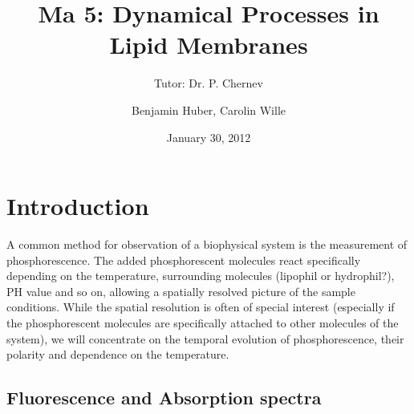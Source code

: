 \documentclass{scrartcl}
\title{Ma 5: Dynamical Processes in Lipid Membranes}
\subtitle{Tutor: Dr. P. Chernev}
\author{Benjamin Huber, Carolin Wille}
\date{January 30, 2012}
\numberwithin{equation}{section}
\numberwithin{figure}{section}
\numberwithin{table}{section}
\begin{document}
\thispagestyle{empty}
\maketitle
\tableofcontents
\clearpage

\section{Introduction}
A common method for observation of a biophysical system is the measurement of phosphorescence. The added phosphorescent molecules react specifically depending on the temperature, surrounding molecules (lipophil or hydrophil?), PH value and so on, allowing a spatially resolved picture of the sample conditions. While the spatial resolution is often of special interest (especially if the phosphorescent molecules are specifically attached to other molecules of the system), we will concentrate on the temporal evolution of phosphorescence, their polarity and dependence on the temperature.


\subsection{Fluorescence and Absorption spectra}
\end{document}
